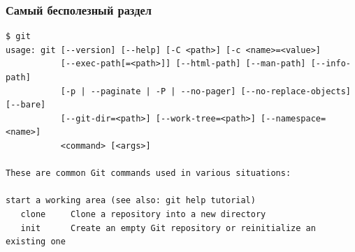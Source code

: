 \documentclass[pdf,russian,aspectratio=169]{beamer}
\begin{document}
\begin{frame}[fragile]
    \frametitle{Самый бесполезный раздел}
    \pause
    \center
    \onslide<+->
    \begin{Verbatim}[fontsize=\relsize{-3}]
$ git
usage: git [--version] [--help] [-C <path>] [-c <name>=<value>]
           [--exec-path[=<path>]] [--html-path] [--man-path] [--info-path]
           [-p | --paginate | -P | --no-pager] [--no-replace-objects] [--bare]
           [--git-dir=<path>] [--work-tree=<path>] [--namespace=<name>]
           <command> [<args>]

These are common Git commands used in various situations:

start a working area (see also: git help tutorial)
   clone     Clone a repository into a new directory
   init      Create an empty Git repository or reinitialize an existing one


\end{Verbatim}
\end{frame}
\end{document}
